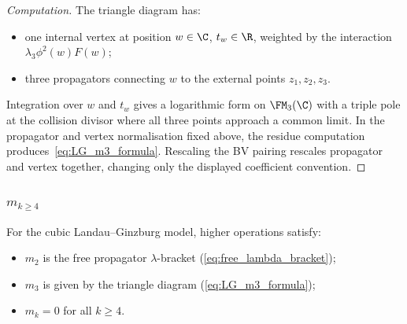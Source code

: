 \begin{proof}[Computation]
The triangle diagram has:
\begin{itemize}
\item one internal vertex at position $w \in \C$, $t_w \in \R$, weighted by the interaction $\lambda_3 \phi^2(w) F(w)$;
\item three propagators connecting $w$ to the external points $z_1, z_2, z_3$.
\end{itemize}

Integration over $w$ and $t_w$ gives a logarithmic form on $\FM_3(\C)$ with a triple pole at the collision divisor where all three points approach a common limit. In the propagator and vertex normalisation fixed above, the residue computation produces~\eqref{eq:LG_m3_formula}. Rescaling the BV pairing rescales propagator and vertex together, changing only the displayed coefficient convention.
\end{proof}

\subsubsection{$m_{k \geq 4}$}

\begin{proposition}
\label{prop:LG_truncation}
For the cubic Landau--Ginzburg model, higher operations satisfy:
\begin{itemize}
\item $m_2$ is the free propagator $\lambda$-bracket (\ref{eq:free_lambda_bracket});
\item $m_3$ is given by the triangle diagram (\ref{eq:LG_m3_formula});
\item $m_k = 0$ for all $k \geq 4$.
\end{itemize}
\end{proposition}

